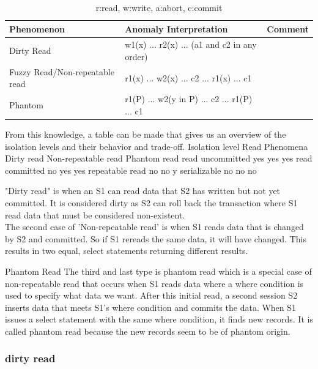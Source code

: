 \documentclass[a4paper,10pt,titlepage]{report}
\begin{document}
    \begin{table}[h]
        \begin{tabular}{|l|l|l|}
            \hline
            Phenomenon                     & Anomaly Interpretation                       & Comment \\\hline
            Dirty Read                     & w1(x) ... r2(x) ... (a1 and c2 in any order) &         \\\hline
            Fuzzy Read/Non-repeatable read & r1(x) ... w2(x) ... c2 ... r1(x) ... c1      &         \\\hline
            Phantom                        & r1(P) ... w2(y in P) ... c2 ... r1(P) ... c1 &         \\ \hline
        \end{tabular}
        \caption{r:read, w:write, a:abort, c:commit}
    \end{table}


From this knowledge, a table can be made that gives us an overview of the isolation levels and their behavior and trade-off.
Isolation level	Read Phenomena
Dirty read	Non-repeatable read	Phantom read
read uncommitted	yes	yes	yes
read committed	no	yes	yes
repeatable read	no	no	y
serializable	no	no	no


"Dirty read" is when an S1 can read data that S2 has written but not yet committed. It is considered dirty as S2 can roll back the transaction where S1 read data that must be considered non-existent. %
\\
The second case of 'Non-repeatable read' is when S1 reads data that is changed by S2 and committed. So if S1 rereads the same data, it will have changed. This results in two equal, select statements returning different results.  

Phantom Read
The third and last type is phantom read which is a special case of non-repeatable read that occurs when S1 reads data where a  where condition is used to specify what data we want. After this initial read, a second session S2 inserts data that meets S1's where condition and commits the data. When S1 issues a select statement with the same where condition, it finds new records. It is called phantom read because the new records seem to be of phantom origin.

    \subsubsection{dirty read}
\end{document}
